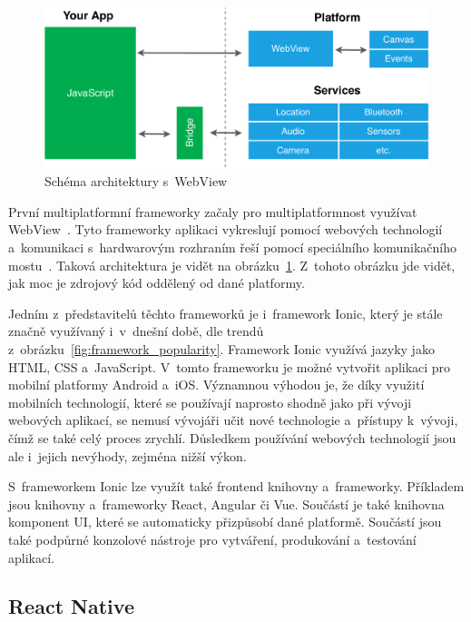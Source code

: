 \begin{figure}
    \centering
    \includegraphics[width=\linewidth]{assets/technology-research/framework/webview.pdf}
    \caption{Schéma architektury s~WebView~\cite{hackernoon_flutter}}
    \label{fig:framework_webview}
\end{figure}

První multiplatformní frameworky začaly pro multiplatformnost využívat
WebView~\cite{hackernoon_flutter}.
Tyto frameworky aplikaci vykreslují pomocí webových technologií
a~komunikaci s~hardwarovým rozhraním řeší pomocí speciálního komunikačního
mostu~\cite{hackernoon_flutter}.
Taková architektura je vidět na obrázku~\ref{fig:framework_webview}.
Z~tohoto obrázku jde vidět,
jak moc je zdrojový kód oddělený od dané platformy.

Jedním z~představitelů těchto frameworků je i~framework Ionic,
který je stále značně využívaný i~v~dnešní době,
dle trendů z~obrázku~\ref{fig:framework_popularity}.
Framework Ionic využívá jazyky jako HTML, CSS a~JavaScript.
V~tomto frameworku je možné vytvořit aplikaci pro mobilní platformy
Android a~iOS.
Významnou výhodou je,
že díky využití mobilních technologií,
které se používají naprosto shodně jako při vývoji webových aplikací,
se nemusí vývojáři učit nové technologie a~přístupy k~vývoji,
čímž se také celý proces zrychlí.
Důsledkem používání webových technologií jsou ale i~jejich nevýhody,
zejména nižší výkon.~\cite{dashmagazine_mobile_frameworks}

S~frameworkem Ionic lze využít také frontend knihovny a~frameworky.
Příkladem jsou knihovny a~frameworky React, Angular či Vue.
Součástí je také knihovna komponent UI,
které se automaticky přizpůsobí dané platformě.
Součástí jsou také podpůrné konzolové nástroje pro vytváření, produkování
a~testování aplikací.~\cite{ionic}

\subsection{React Native}

